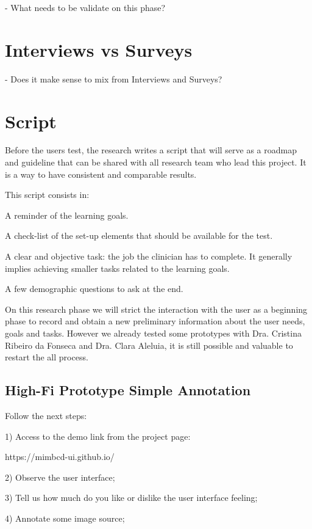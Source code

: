 - What needs to be validate on this phase?

\section{Interviews vs Surveys}

- Does it make sense to mix from Interviews and Surveys?

\section{Script}

Before the users test, the research writes a script that will serve as a roadmap and guideline that can be shared with all research team who lead this project. It is a way to have consistent and comparable results.

This script consists in:

 A reminder of the learning goals.

 A check-list of the set-up elements that should be available for the test.

 A clear and objective task: the job the clinician has to complete. It generally implies achieving smaller tasks related to the learning goals.

 A few demographic questions to ask at the end.

On this research phase we will strict the interaction with the user as a beginning phase to record and obtain a new preliminary information about the user needs, goals and tasks. However we already tested some prototypes with Dra. Cristina Ribeiro da Fonseca and Dra. Clara Aleluia, it is still possible and valuable to restart the all process.

\clearpage

\subsection{High-Fi Prototype Simple Annotation}

Follow the next steps:

1) Access to the demo link from the project page:

https://mimbcd-ui.github.io/

2) Observe the user interface;

3) Tell us how much do you like or dislike the user interface feeling;

4) Annotate some image source;

